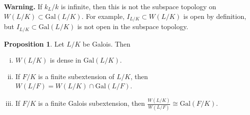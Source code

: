 \documentclass{article}
\theoremstyle{definition}
\newtheorem{prop}[theorem]{Proposition}
\begin{document}
\textbf{Warning.} If $k_L/k$ is infinite, then this is not the subspace topology on $W(L/K) \subset \text{Gal}(L/K)$. For example, $I_{L/K} \subset W(L/K)$ is open by definition, but $I_{L/K} \subset \text{Gal}(L/K)$ is not open in the subspace topology. 
\begin{prop}
    Let $L/K$ be Galois. Then 
    \begin{enumerate}[(i)]
        \item $W(L/K)$ is dense in $\text{Gal}(L/K)$.
        \item If $F/K$ is a finite subextension of $L/K$, then $W(L/F) = W(L/K) \cap \text{Gal}(L/F)$.
        \item If $F/K$ is a finite Galois subextension, then $\frac{W(L/K)}{W(L/F)} \cong \text{Gal}(F/K)$.
    \end{enumerate}
\end{prop}
\end{document}
